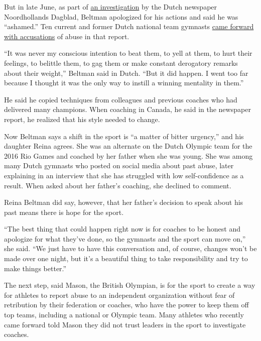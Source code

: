 But in late June, as part of
\href{https://www.noordhollandsdagblad.nl/cnt/dmf20200724_98276713/turncoach-gerrit-beltman-verbreekt-stilzwijgen-over-zijn-onmenselijke-trainingsmethoden-ik-mishandelde-en-vernederde-jonge-turnsters-om-medailles-te-w?utm_source=google\&utm_medium=organic}{an
investigation} by the Dutch newspaper Noordhollands Dagblad, Beltman
apologized for his actions and said he was ``ashamed.'' Ten current and
former Dutch national team gymnasts
\href{https://nltimes.nl/2020/07/25/top-gymnastics-coach-acknowledges-history-abuse-mistreatment}{came
forward with accusations} of abuse in that report.

``It was never my conscious intention to beat them, to yell at them, to
hurt their feelings, to belittle them, to gag them or make constant
derogatory remarks about their weight,'' Beltman said in Dutch. ``But it
did happen. I went too far because I thought it was the only way to
instill a winning mentality in them.''

He said he copied techniques from colleagues and previous coaches who
had delivered many champions. When coaching in Canada, he said in the
newspaper report, he realized that his style needed to change.

Now Beltman says a shift in the sport is ``a matter of bitter urgency,''
and his daughter Reina agrees. She was an alternate on the Dutch Olympic
team for the 2016 Rio Games and coached by her father when she was
young. She was among many Dutch gymnasts who posted on social media
about past abuse, later explaining in an interview that she has
struggled with low self-confidence as a result. When asked about her
father's coaching, she declined to comment.

Reina Beltman did say, however, that her father's decision to speak
about his past means there is hope for the sport.

``The best thing that could happen right now is for coaches to be honest
and apologize for what they've done, so the gymnasts and the sport can
move on,'' she said. ``We just have to have this conversation and, of
course, changes won't be made over one night, but it's a beautiful thing
to take responsibility and try to make things better.''

The next step, said Mason, the British Olympian, is for the sport to
create a way for athletes to report abuse to an independent organization
without fear of retribution by their federation or coaches, who have the
power to keep them off top teams, including a national or Olympic team.
Many athletes who recently came forward told Mason they did not trust
leaders in the sport to investigate coaches.


